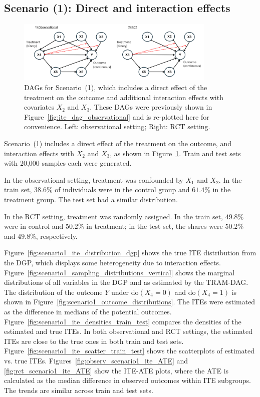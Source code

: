 \subsection{Scenario (1): Direct and interaction effects} 


\begin{figure}[H]
\centering
\includegraphics[width=0.85\textwidth]{img/exp4_dags.png}
\caption{DAGs for Scenario~(1), which includes a direct effect of the treatment on the outcome and additional interaction effects with covariates $X_2$ and $X_3$. These DAGs were previously shown in Figure~\ref{fig:ite_dag_observational} and is re-plotted here for convenience. Left: observational setting; Right: RCT setting.}
\label{fig:ite_dag_observational_1}
\end{figure}

Scenario~(1) includes a direct effect of the treatment on the outcome, and interaction effects with $X_2$ and $X_3$, as shown in Figure~\ref{fig:ite_dag_observational_1}. Train and test sets with 20,000 samples each were generated.

In the observational setting, treatment was confounded by $X_1$ and $X_2$. In the train set, $38.6$\% of individuals were in the control group and $61.4$\% in the treatment group. The test set had a similar distribution.

In the RCT setting, treatment was randomly assigned. In the train set, $49.8$\% were in control and $50.2$\% in treatment; in the test set, the shares were $50.2$\% and $49.8$\%, respectively.

Figure~\ref{fig:scenario1_ite_distribution_dgp} shows the true ITE distribution from the DGP, which displays some heterogeneity due to interaction effects. Figure~\ref{fig:scenario1_sampling_distributions_vertical} shows the marginal distributions of all variables in the DGP and as estimated by the TRAM-DAG. The distribution of the outcome $Y$ under $\text{do}(X_4 = 0)$ and $\text{do}(X_4 = 1)$ is shown in Figure~\ref{fig:scenario1_outcome_distributions}. The ITEs were estimated as the difference in medians of the potential outcomes. Figure~\ref{fig:scenario1_ite_densities_train_test} compares the densities of the estimated and true ITEs. In both observational and RCT settings, the estimated ITEs are close to the true ones in both train and test sets. Figure~\ref{fig:scenario1_ite_scatter_train_test} shows the scatterplots of estimated vs. true ITEs. Figures~\ref{fig:observ_scenario1_ite_ATE} and \ref{fig:rct_scenario1_ite_ATE} show the ITE-ATE plots, where the ATE is calculated as the median difference in observed outcomes within ITE subgroups. The trends are similar across train and test sets.




